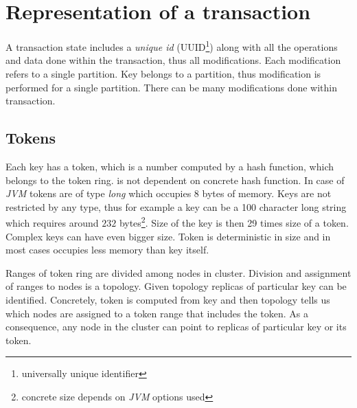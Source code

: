 
\section{Representation of a transaction}
A transaction state includes a \emph{unique id} (UUID\footnote{universally unique identifier}) along with all the operations and data done within the transaction, thus all modifications. 
Each modification refers to a single partition. Key belongs to a partition, thus modification is performed for a single partition. There can be many modifications done within transaction. 

\subsection{Tokens}

Each key has a token, which is a number computed by a hash function, which belongs to the token ring. \mpt is not dependent on concrete hash function. In case of \emph{JVM} tokens are of type \emph{long} which occupies 8 bytes of memory. Keys are not restricted by any type, thus for example a key can be a 100 character long string which requires around $232$ bytes\footnote{concrete size depends on \emph{JVM} options used}. Size of the key is then 29 times size of a token. Complex keys can have even bigger size. Token is deterministic in size and in most cases occupies less memory than key itself.

Ranges of token ring are divided among nodes in cluster. Division and assignment of ranges to nodes is a topology. Given topology replicas of particular key can be identified. Concretely, token is computed from key and then topology tells us which nodes are assigned to a token range that includes the token. As a consequence, any node in the cluster can point to replicas of particular key or its token.


